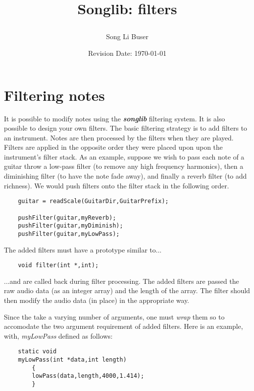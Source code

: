 \documentclass{article}
\title{Songlib: filters\\
\date{Revision Date: \today}}
\author{Song Li Buser}
\begin{document}
\maketitle

\W\subsubsection*{}
\W\htmlrule

\section*{Filtering notes}

It is possible to modify notes using the {\it\bf songlib} filtering system.
It is also possible to design your own filters. The basic filtering
strategy is to add filters to an instrument. Notes are then processed by
the filters when they are played. Filters are applied in the opposite order
they were placed upon
upon the instrument's filter stack.
As an example, suppose we wish to pass each note of a guitar throw a
low-pass filter (to remove any high frequency harmonics),
then a diminishing filter (to have the note fade away),
and
finally a reverb filter (to add richness).
We would push filters onto the filter stack in
the following order.

\begin{verbatim}
    guitar = readScale(GuitarDir,GuitarPrefix);

    pushFilter(guitar,myReverb);
    pushFilter(guitar,myDiminish);
    pushFilter(guitar,myLowPass);
\end{verbatim}

The added filters must have a prototype similar to...

\begin{verbatim}
    void filter(int *,int);
\end{verbatim}

...and are called back during filter processing. The added filters are
passed the raw audio data (as an integer array) and the length of the
array. The filter should then modify the audio data (in place) in the
appropriate way.

Since the
take a varying number of arguments, one must
{\it wrap} them so to accomodate the two argument requirement of added
filters. Here is an example, with, {\it myLowPass} defined as follows:

\begin{verbatim}
    static void
    myLowPass(int *data,int length)
        {
        lowPass(data,length,4000,1.414);
        }
\end{verbatim}
\end{document}

